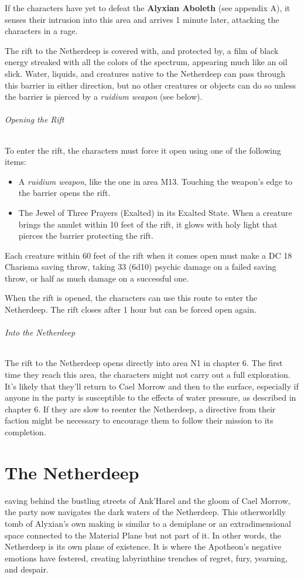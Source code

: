 \documentclass[10pt,a4paper,twoside,fancy,bg=print,twocolumn,openany,nodeprecatedcode]{dndbook}
\begin{document}
If the characters have yet to defeat the \textbf{Alyxian Aboleth} (see appendix A), it senses their intrusion into this area and arrives 1 minute later, attacking the characters in a rage.

The rift to the Netherdeep is covered with, and protected by, a film of black energy streaked with all the colors of the spectrum, appearing much like an oil slick. Water, liquids, and creatures native to the Netherdeep can pass through this barrier in either direction, but no other creatures or objects can do so unless the barrier is pierced by a \textit{ruidium weapon} (see below).

\subparagraph{Opening the Rift}
To enter the rift, the characters must force it open using one of the following items:


\begin{itemize}
\item A \textit{ruidium weapon}, like the one in area M13. Touching the weapon's edge to the barrier opens the rift.
\item The Jewel of Three Prayers (Exalted) in its Exalted State. When a creature brings the amulet within 10 feet of the rift, it glows with holy light that pierces the barrier protecting the rift.
\end{itemize}

Each creature within 60 feet of the rift when it comes open must make a DC 18 Charisma saving throw, taking 33 (6d10) psychic damage on a failed saving throw, or half as much damage on a successful one.

When the rift is opened, the characters can use this route to enter the Netherdeep. The rift closes after 1 hour but can be forced open again.

\subparagraph{Into the Netherdeep}
The rift to the Netherdeep opens directly into area N1 in chapter 6. The first time they reach this area, the characters might not carry out a full exploration. It's likely that they'll return to Cael Morrow and then to the surface, especially if anyone in the party is susceptible to the effects of water pressure, as described in chapter 6. If they are slow to reenter the Netherdeep, a directive from their faction might be necessary to encourage them to follow their mission to its completion.

\chapter{The Netherdeep}
eaving behind the bustling streets of Ank'Harel and the gloom of Cael Morrow, the party now navigates the dark waters of the Netherdeep. This otherworldly tomb of Alyxian's own making is similar to a demiplane or an extradimensional space connected to the Material Plane but not part of it. In other words, the Netherdeep is its own plane of existence. It is where the Apotheon's negative emotions have festered, creating labyrinthine trenches of regret, fury, yearning, and despair.
\end{document}
